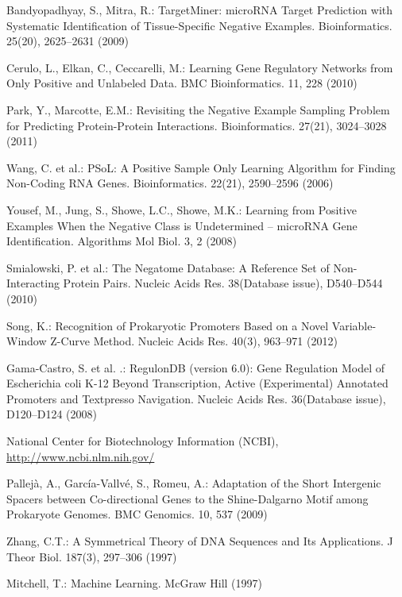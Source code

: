 \documentclass[runningheads,a4paper]{llncs}
\begin{document}
\begin{thebibliography}{4}
 Bandyopadhyay, S., Mitra, R.: TargetMiner: microRNA Target Prediction with Systematic Identification of Tissue-Specific Negative Examples. Bioinformatics. 25(20), 2625--2631 (2009)

 Cerulo, L., Elkan, C., Ceccarelli, M.: Learning Gene Regulatory Networks from Only Positive and Unlabeled Data. BMC Bioinformatics. 11, 228 (2010)

 Park, Y., Marcotte, E.M.: Revisiting the Negative Example Sampling Problem for Predicting Protein-Protein Interactions. Bioinformatics. 27(21), 3024--3028 (2011)

 Wang, C. et al.: PSoL: A Positive Sample Only Learning Algorithm for Finding Non-Coding RNA Genes. Bioinformatics. 22(21), 2590--2596 (2006)

 Yousef, M., Jung, S., Showe, L.C., Showe, M.K.: Learning from Positive Examples When the Negative Class is Undetermined -- microRNA Gene Identification. Algorithms Mol Biol. 3, 2 (2008)

 Smialowski, P. et al.: The Negatome Database: A Reference Set of Non-Interacting Protein Pairs. Nucleic Acids Res. 38(Database issue), D540--D544 (2010)

 Song, K.: Recognition of Prokaryotic Promoters Based on a Novel Variable-Window Z-Curve Method. Nucleic Acids Res. 40(3), 963--971 (2012)

 Gama-Castro, S. et al. .: RegulonDB (version 6.0): Gene Regulation Model of Escherichia coli K-12 Beyond Transcription, Active (Experimental) Annotated Promoters and Textpresso Navigation. Nucleic Acids Res. 36(Database issue), D120--D124 (2008)

 National Center for Biotechnology Information (NCBI), \url{http://www.ncbi.nlm.nih.gov/}

 Pallej\`{a}, A., Garc\'{i}a-Vallv\'{e}, S., Romeu, A.: Adaptation of the Short Intergenic Spacers between Co-directional Genes to the Shine-Dalgarno Motif among Prokaryote Genomes. BMC Genomics. 10, 537 (2009)

 Zhang, C.T.: A Symmetrical Theory of DNA Sequences and Its Applications. J Theor Biol. 187(3), 297--306 (1997)

 Mitchell, T.: Machine Learning. McGraw Hill (1997)

\end{thebibliography}
\end{document}
